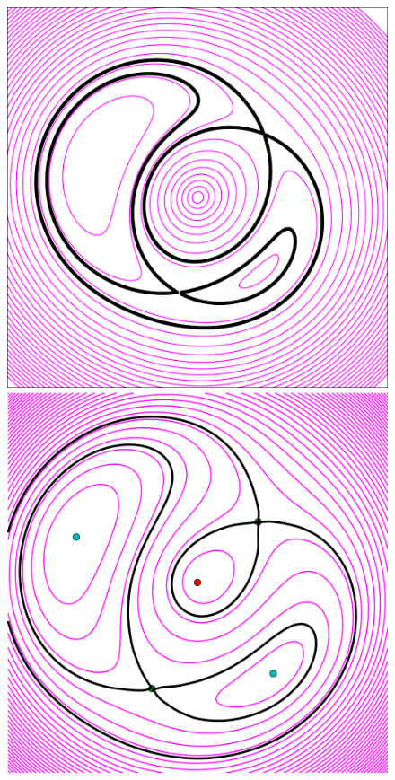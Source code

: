 \documentclass[usenatbib]{mn2e}
\newlength{\myplotswidth}
\begin{document}
\begin{figure}
  \includegraphics[width=\myplotswidth]{fig/ASW0001hpf_006915_arriv}
  \includegraphics[width=\myplotswidth]{fig/006915_spaghetti} \\

\end{figure}
\end{document}
